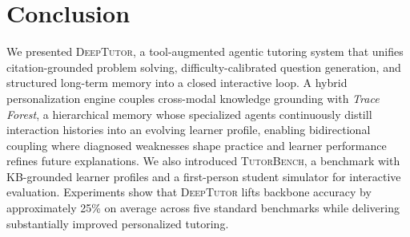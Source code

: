\section{Conclusion}

We presented \textsc{DeepTutor}, a tool-augmented agentic tutoring system that unifies citation-grounded problem solving, difficulty-calibrated question generation, and structured long-term memory into a closed interactive loop.
A hybrid personalization engine couples cross-modal knowledge grounding with \textit{Trace Forest}, a hierarchical memory whose specialized agents continuously distill interaction histories into an evolving learner profile, enabling bidirectional coupling where diagnosed weaknesses shape practice and learner performance refines future explanations.
We also introduced \textsc{TutorBench}, a benchmark with KB-grounded learner profiles and a first-person student simulator for interactive evaluation.
Experiments show that \textsc{DeepTutor} lifts backbone accuracy by approximately 25\% on average across five standard benchmarks while delivering substantially improved personalized tutoring.
